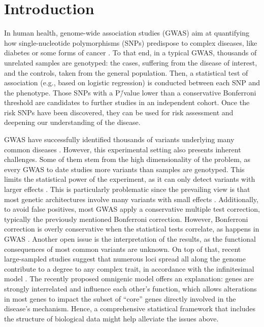 \documentclass[10pt,letterpaper]{article}
\begin{document}
\section{Introduction}

In human health, genome-wide association studies (GWAS) aim at quantifying how single-nucleotide polymorphisms (SNPs) predispose to complex diseases, like diabetes or some forms of cancer \cite{bush_chapter_2012}. To that end, in a typical GWAS, thousands of unrelated samples are genotyped: the cases, suffering from the disease of interest, and the controls, taken from the general population. Then, a statistical test of association (e.g., based on logistic regression) is conducted between each SNP and the phenotype. Those SNPs with a P\=/value lower than a conservative Bonferroni threshold are candidates to further studies in an independent cohort. Once the risk SNPs have been discovered, they can be used for risk assessment and deepening our understanding of the disease.

GWAS have successfully identified thousands of variants underlying many common diseases \cite{buniello_nhgri-ebi_2019}. However, this experimental setting also presents inherent challenges. Some of them stem from the high dimensionality of the problem, as every GWAS to date studies more variants than samples are genotyped. This limits the statistical power of the experiment, as it can only detect variants with larger effects \cite{visscher_10_2017}. This is particularly problematic since the prevailing view is that most genetic architectures involve many variants with small effects \cite{visscher_10_2017}. Additionally, to avoid false positives, most GWAS apply a conservative multiple test correction, typically the previously mentioned Bonferroni correction. However, Bonferroni correction is overly conservative when the statistical tests correlate, as happens in GWAS \cite{wang_statistical_2018}. Another open issue is the interpretation of the results, as the functional consequences of most common variants are unknown. On top of that, recent large-sampled studies suggest that numerous loci spread all along the genome contribute to a degree to any complex trait, in accordance with the infinitesimal model \cite{barton_infinitesimal_2017}. The recently proposed omnigenic model \cite{boyle_expanded_2017} offers an explanation: genes are strongly interrelated and influence each other's function, which allows alterations in most genes to impact the subset of ``core'' genes directly involved in the disease's mechanism. Hence, a comprehensive statistical framework that includes the structure of biological data might help alleviate the issues above.
\end{document}
